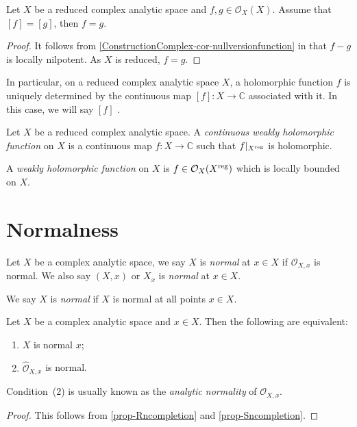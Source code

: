 \begin{proposition}
    Let $X$ be a reduced complex analytic space and $f,g\in \mathcal{O}_X(X)$. Assume that $[f]=[g]$, then $f=g$.
\end{proposition}
\begin{proof}
    It follows from \cref{ConstructionComplex-cor-nullversionfunction} in  that $f-g$ is locally nilpotent. As $X$ is reduced, $f=g$.
\end{proof}
In particular, on a reduced complex analytic space $X$, a holomorphic function $f$ is uniquely determined by the continuous map $[f]:X\rightarrow \mathbb{C}$ associated with it. In this case, we will say $[f]$ .

\begin{definition}
    Let $X$ be a reduced complex analytic space. A \emph{continuous weakly holomorphic function} on $X$ is a continuous map $f:X\rightarrow \mathbb{C}$ such that $f|_{X^{\operatorname{reg}}}$ is holomorphic.

    A \emph{weakly holomorphic function} on $X$ is $f\in \mathcal{O}_X(X^{\operatorname{reg}})$ which is locally bounded on $X$.
\end{definition}

\section{Normalness}
\begin{definition}
    Let $X$ be a complex analytic space, we say $X$ is \emph{normal} at $x\in X$ if $\mathcal{O}_{X,x}$ is normal. We also say $(X,x)$ or $X_x$ is \emph{normal} at $x\in X$.

    We say $X$ is \emph{normal} if $X$ is normal at all points $x\in X$. 
\end{definition}
\begin{proposition}\label{prop-normalcompletion}
    Let $X$ be a complex analytic space and $x\in X$.  Then the following are equivalent:
    \begin{enumerate}
        \item $X$ is normal $x$;
        \item $\hat{\mathcal{O}}_{X,x}$ is normal.
    \end{enumerate}
\end{proposition}
Condition~(2) is usually known as the \emph{analytic normality} of $\mathcal{O}_{X,x}$. 
\begin{proof}
    This follows from \cref{prop-Rncompletion} and \cref{prop-Sncompletion}.
\end{proof}

